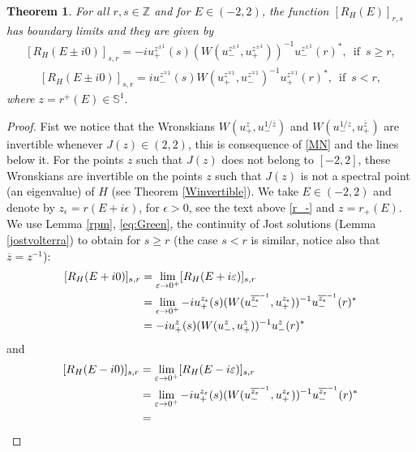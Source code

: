 \documentclass[12pt,oneside,onecolumn,open]{article}
\newtheorem{teo}{Theorem}[section]
\begin{document}
\begin{teo}\label{Green2.1}
    For all $r,s\in \mathbb{Z}$ and for $E\in (-2,2)$, the function $ [R_{H}(E)]_{r,s}$ has boundary limits  and they are given by
\begin{align}\label{eq:Green1.1}
        [R_{H}(E\pm i0)]_{s,r}=-iu_{+}^{z^{\pm 1}}(s)(W(u_{-}^{z^{\pm 1}},  u_{+}^{z^{\pm 1}} ))^{-1} u_{-}^{z^{\pm 1}}(r)^{*}, \,\,\, \text{if}\,\,\, s\geq r,
    \end{align} 
 \begin{align}\label{eq:Green2.1}
        [R_{H}(E\pm  i0)]_{s,r}=iu_{-}^{z^{\mp 1}}(s)W(u_+^{z^{\mp 1}}, u_-^{z^{\mp 1}})^{-1}u_{+}^{z^{\mp 1}}(r)^{*},\,\,\, \text{if}\,\,\, s< r,
    \end{align}
 where $z=r^+(E)\in \mathbb{S}^{1}.$
\end{teo}
\begin{proof}
Fist we notice that the Wronskians \(W(u_{+}^{z}, u_{-}^{1/\overline{z}})\) and \(W(u_{-}^{1/z},  u_{+}^{\overline{z}})\) are invertible whenever $J(z)  \in (2, 2)$, this is consequence of \eqref{MN} and the lines below it. For the points $z$ such that
$ J(z) $ does not belong to  $  [-2, 2] $, these Wronskians are invertible  on the points $ z $ such that $J(z)$ is not a spectral point (an eigenvalue) of  $H$ (see Theorem \ref{Winvertible}). We take $ E \in (-2, 2) $  and denote by $ z_\epsilon = r(E + i \epsilon)   $,  for $ \epsilon > 0$,  see the text above \eqref{r_-} and $z = r_+(E)$. 
We use Lemma \ref{rpm},  \eqref{eq:Green}, the continuity of Jost solutions (Lemma \ref{jostvolterra}) to obtain for $ s \geq r $ (the case $ s< r $ is similar, notice also that $ \overline{z} = z^{-1} $):
    \begin{align}
 \label{eq:greenlimit}
    [R_{H}(E+ i0)]_{s,r}&=\lim _{\varepsilon \to 0^{+}}[R_{H}(E+i\varepsilon )]_{s,r}
    \\& \notag =  \lim_{\epsilon \to 0^{+} }-iu_{+}^{z_{\epsilon}}(s)(W(u_{-}^{\overline{z_
    {\epsilon}}^{-1}},  u_{+}^{z_{\epsilon}} ))^{-1} u_{-}^{\overline{ z_{\epsilon}}^{-1}}(r)^{*}    \\& \notag = -iu_{+}^{z}(s)(W(u_{-}^{z},  u_{+}^{z} ))^{-1} u_{-}^{z}(r)^{*} 
  \end{align}
  and
  \begin{align}
 \label{eq:greenlimit2}
    [R_{H}(E- i0)]_{s,r}&=\lim _{\varepsilon \to 0^{+}}[R_{H}(E-i\varepsilon )]_{s,r}\\&\notag= \lim _{\varepsilon \to 0^{+}}
     -iu_{+}^{z_{\varepsilon }}(s)(W(u_{-}^{\overline{z_{\varepsilon }}^{-1}},u_{+}^{z_{\varepsilon }}))^{-1} u_{-}^{\overline{z_{\varepsilon }}^{-1}}(r)^{*}\\&\notag= 

\end{align}
\end{proof}
\end{document}
